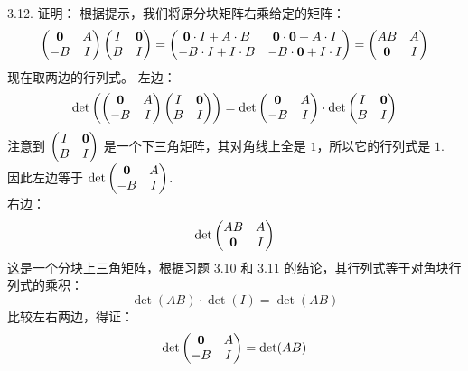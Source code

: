 \begin{exer}
3.12. 证明：
根据提示，我们将原分块矩阵右乘给定的矩阵：
$$ \begin{pmatrix} \mathbf{0} & A \\ -B & I \end{pmatrix} \begin{pmatrix} I & \mathbf{0} \\ B & I \end{pmatrix} = \begin{pmatrix} \mathbf{0} \cdot I + A \cdot B & \mathbf{0} \cdot \mathbf{0} + A \cdot I \\ -B \cdot I + I \cdot B & -B \cdot \mathbf{0} + I \cdot I \end{pmatrix} = \begin{pmatrix} AB & A \\ \mathbf{0} & I \end{pmatrix} $$
现在取两边的行列式。
左边：
$$ \det \left( \begin{pmatrix} \mathbf{0} & A \\ -B & I \end{pmatrix} \begin{pmatrix} I & \mathbf{0} \\ B & I \end{pmatrix} \right) = \det \begin{pmatrix} \mathbf{0} & A \\ -B & I \end{pmatrix} \cdot \det \begin{pmatrix} I & \mathbf{0} \\ B & I \end{pmatrix} $$
注意到 $\begin{pmatrix} I & \mathbf{0} \\ B & I \end{pmatrix}$ 是一个下三角矩阵，其对角线上全是 $1$，所以它的行列式是 $1$.~
因此左边等于 $\det \begin{pmatrix} \mathbf{0} & A \\ -B & I \end{pmatrix}$.~
\\
右边：
$$ \det \begin{pmatrix} AB & A \\ \mathbf{0} & I \end{pmatrix} $$
这是一个分块上三角矩阵，根据习题 3.10 和 3.11 的结论，其行列式等于对角块行列式的乘积：
$$ \det(AB) \cdot \det(I) = \det(AB) $$
比较左右两边，得证：
$$ \det \begin{pmatrix} \mathbf{0} & A \\ -B & I \end{pmatrix} = \det(AB) $$



\end{exer}
